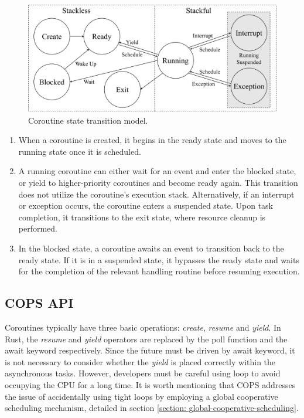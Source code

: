 \documentclass[conference]{IEEEtran}
\begin{document}
\begin{figure}[tbp]
  \centering
  \includegraphics[width=\linewidth]{assets/cstate.pdf}
  \caption{Coroutine state transition model.}
  \label{fig:state}
  \vspace{-1em}
\end{figure}

\begin{enumerate}[leftmargin=*]
    \item When a coroutine is created, it begins in the ready state and moves to the running state once it is scheduled.
    \item A running coroutine can either wait for an event and enter the blocked state, or yield to higher-priority coroutines and become ready again. This transition does not utilize the coroutine's execution stack. Alternatively, if an interrupt or exception occurs, the coroutine enters a suspended state. Upon task completion, it transitions to the exit state, where resource cleanup is performed.
    \item In the blocked state, a coroutine awaits an event to transition back to the ready state. If it is in a suspended state, it bypasses the ready state and waits for the completion of the relevant handling routine before resuming execution.
\end{enumerate}

\subsection{COPS API}
\label{section: cops api}

Coroutines typically have three basic operations: \textit{create}, \textit{resume} and \textit{yield}. In Rust, the \textit{resume} and \textit{yield} operators are replaced by the poll function and the await keyword respectively.
Since the future must be driven by await keyword, it is not necessary to consider whether the \textit{yield} is placed correctly within the asynchronous tasks. However, developers must be careful using loop to avoid occupying the CPU for a long time. It is worth mentioning that COPS addresses the issue of accidentally using tight loops by employing a global cooperative scheduling mechanism, detailed in section \ref{section: global-cooperative-scheduling}.
\end{document}
